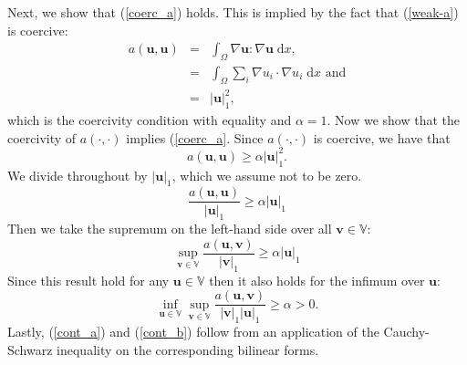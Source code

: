 \documentclass[12pt,a4paper]{article}
\theoremstyle{definition}
\begin{document}
Next, we show that (\ref{coerc_a}) holds.  This is implied by the fact that (\ref{weak-a}) is coercive:
\begin{eqnarray}
		a\left(\textbf{u},\textbf{u}\right)&=&\int_{\Omega}\nabla \textbf{u} : \nabla \textbf{u}\;\mathrm{d}x,\nonumber\\
		&=&\int_{\Omega}\sum_{i}\nabla u_i \cdot \nabla u_i\;\mathrm{d}x\text{ and}\nonumber\\
		&=&\left|\textbf{u}\right|_1^2,\nonumber
\end{eqnarray}
which is the coercivity condition with equality and $\alpha = 1$.  Now we show that  the coercivity of $a\left(\cdot,\cdot\right)$ implies (\ref{coerc_a}.  Since $a\left(\cdot,\cdot\right)$ is coercive, we have that
\begin{equation}
a\left(\textbf{u},\textbf{u}\right)\geq \alpha  \left|\textbf{u}\right|_1^2 \nonumber.
\end{equation}
We divide throughout by $\left|\textbf{u}\right|_1$, which we assume not to be zero. 
\begin{equation}
\frac{a\left(\textbf{u},\textbf{u}\right)}{\left|\textbf{u}\right|_1}\geq \alpha \left|\textbf{u}\right|_1 \nonumber
\end{equation}
 Then we take the supremum on the left-hand side over all $\textbf{v}\in\mathbb{V}$:
 \begin{equation}
 \sup_{\textbf{v}\in \mathbb{V}}\frac{a\left(\textbf{u},\textbf{v}\right)}{\left|\textbf{v}\right|_1}\geq \alpha \left|\textbf{u}\right|_1\nonumber
 \end{equation}
 Since this result hold for any $\textbf{u}\in \mathbb{V}$ then it also holds for the infimum over $\textbf{u}$:
\begin{equation}
\inf_{\textbf{u}\in \mathbb{V}}\sup_{\textbf{v}\in \mathbb{V}}\frac{a\left(\textbf{u},\textbf{v}\right)}{\left|\textbf{v}\right|_1\left|\textbf{u}\right|_1} \geq \alpha>0\nonumber.
\end{equation}
Lastly, (\ref{cont_a}) and (\ref{cont_b}) follow from an application of the Cauchy-Schwarz inequality on the corresponding bilinear forms.
\end{document}
